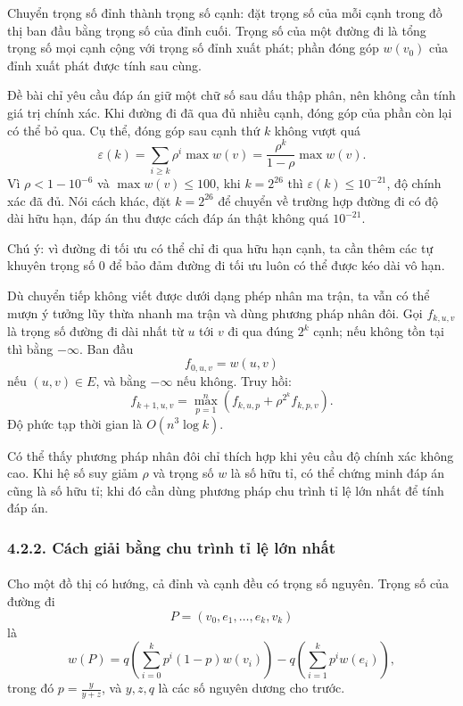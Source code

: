 \documentclass[11pt]{article}
\begin{document}
Chuyển trọng số đỉnh thành trọng số cạnh: đặt trọng số của mỗi cạnh trong đồ
thị ban đầu bằng trọng số của đỉnh cuối. Trọng số của một đường đi là tổng
trọng số mọi cạnh cộng với trọng số đỉnh xuất phát; phần đóng góp \(w(v_0)\)
của đỉnh xuất phát được tính sau cùng.

Đề bài chỉ yêu cầu đáp án giữ một chữ số sau dấu thập phân, nên không cần tính
giá trị chính xác. Khi đường đi đã qua đủ nhiều cạnh, đóng góp của phần còn lại
có thể bỏ qua. Cụ thể, đóng góp sau cạnh thứ \(k\) không vượt quá
\[
  \varepsilon(k)
  =
  \sum_{i\ge k}\rho^i\max w(v)
  =
  \frac{\rho^k}{1-\rho}\max w(v).
\]
Vì \(\rho<1-10^{-6}\) và \(\max w(v)\le100\), khi \(k=2^{26}\) thì
\(\varepsilon(k)\le10^{-21}\), độ chính xác đã đủ. Nói cách khác, đặt
\(k=2^{26}\) để chuyển về trường hợp đường đi có độ dài hữu hạn, đáp án thu
được cách đáp án thật không quá \(10^{-21}\).

Chú ý: vì đường đi tối ưu có thể chỉ đi qua hữu hạn cạnh, ta cần thêm các tự
khuyên trọng số \(0\) để bảo đảm đường đi tối ưu luôn có thể được kéo dài vô
hạn.

Dù chuyển tiếp không viết được dưới dạng phép nhân ma trận, ta vẫn có thể mượn
ý tưởng lũy thừa nhanh ma trận và dùng phương pháp nhân đôi. Gọi
\(f_{k,u,v}\) là trọng số đường đi dài nhất từ \(u\) tới \(v\) đi qua đúng
\(2^k\) cạnh; nếu không tồn tại thì bằng \(-\infty\). Ban đầu
\[
  f_{0,u,v}=w(u,v)
\]
nếu \((u,v)\in E\), và bằng \(-\infty\) nếu không. Truy hồi:
\[
  f_{k+1,u,v}
  =
  \max_{p=1}^{n}\left(f_{k,u,p}+\rho^{2^k}f_{k,p,v}\right).
\]
Độ phức tạp thời gian là \(O(n^3\log k)\).

Có thể thấy phương pháp nhân đôi chỉ thích hợp khi yêu cầu độ chính xác không
cao. Khi hệ số suy giảm \(\rho\) và trọng số \(w\) là số hữu tỉ, có thể chứng
minh đáp án cũng là số hữu tỉ; khi đó cần dùng phương pháp chu trình tỉ lệ lớn
nhất để tính đáp án.

\subsubsection*{4.2.2. Cách giải bằng chu trình tỉ lệ lớn nhất}

\paragraph{}
Cho một đồ thị có hướng, cả đỉnh và cạnh đều có trọng số nguyên. Trọng số của
đường đi
\[
  P=(v_0,e_1,\ldots,e_k,v_k)
\]
là
\[
  w(P)
  =
  q\left(\sum_{i=0}^{k}p^i(1-p)w(v_i)\right)
  -
  q\left(\sum_{i=1}^{k}p^i w(e_i)\right),
\]
trong đó \(p=\frac{y}{y+z}\), và \(y,z,q\) là các số nguyên dương cho trước.
\end{document}
